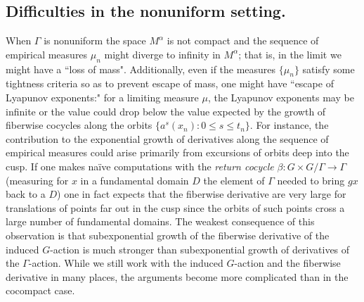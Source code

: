 \documentclass[10pt,reqno]{amsart}
\theoremstyle{Theorem}
\theoremstyle{definition}
\theoremstyle{remark}
\begin{document}
\subsection{Difficulties in the nonuniform setting.} When $\Gamma$ is nonuniform
the space $M^{\alpha}$ is not compact and the sequence of empirical measures $\mu_n$ might  diverge to infinity in $M^{\alpha}$; that is, in the limit we might have a ``loss of mass".
Additionally, even if the measures $\{\mu_n\}$ satisfy some tightness criteria so as to prevent escape of mass, one might have  ``escape of Lyapunov exponents:" for a limiting measure $\mu$, the Lyapunov exponents may be infinite or the value could drop below the value expected by the growth of fiberwise cocycles along the orbits $\{a^s(x_n): 0\le s\le t_n\}$.
For instance,  the contribution to the exponential growth of derivatives along the sequence of empirical measures could arise primarily from excursions of orbits deep into the cusp.  If one makes na\"ive computations with the \emph{return cocycle} $\beta\colon G \times G/\Gamma \rightarrow \Gamma$ (measuring for $x$ in a fundamental domain $D$ the element of $\Gamma$ needed to bring $gx$ back to a $D$)  one in fact expects that the fiberwise derivative are very large for translations of points far out in the cusp since the orbits of such points cross a large number of fundamental domains. %
The weakest consequence of this observation is that subexponential growth of the fiberwise derivative of the induced $G$-action is much stronger than subexponential growth of derivatives of the $\Gamma$-action.  While we   still     work with the induced $G$-action and the fiberwise derivative in many places, the arguments become more complicated than in the cocompact case.
\end{document}
